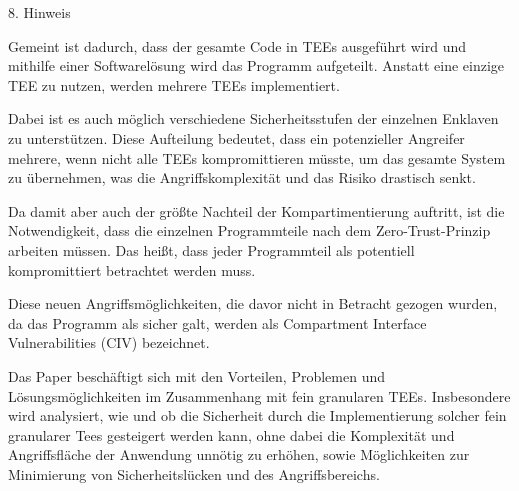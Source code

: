 8. Hinweis

Gemeint ist dadurch, dass der gesamte Code in TEEs ausgeführt wird und mithilfe einer Softwarelösung wird das Programm aufgeteilt. Anstatt eine einzige TEE zu nutzen, werden mehrere TEEs implementiert. 

Dabei ist es auch möglich verschiedene Sicherheitsstufen der einzelnen Enklaven zu unterstützen. Diese Aufteilung bedeutet, dass ein potenzieller Angreifer mehrere, wenn nicht alle TEEs kompromittieren müsste, um das gesamte System zu übernehmen, was die Angriffskomplexität und das Risiko drastisch senkt.

Da damit aber auch der größte Nachteil der Kompartimentierung auftritt, ist die Notwendigkeit, dass die einzelnen Programmteile nach dem Zero-Trust-Prinzip arbeiten müssen. Das heißt, dass jeder Programmteil als potentiell kompromittiert betrachtet werden muss. 

Diese neuen Angriffsmöglichkeiten, die davor nicht in Betracht gezogen wurden, da das Programm als sicher galt, werden als Compartment Interface Vulnerabilities (CIV) bezeichnet.

Das Paper beschäftigt sich mit den Vorteilen, Problemen und Lösungsmöglichkeiten im Zusammenhang mit fein granularen TEEs. Insbesondere wird analysiert, wie und ob die Sicherheit durch die Implementierung solcher fein granularer Tees gesteigert werden kann, ohne dabei die Komplexität und Angriffsfläche der Anwendung unnötig zu erhöhen, sowie Möglichkeiten zur Minimierung von Sicherheitslücken und des Angriffsbereichs.
